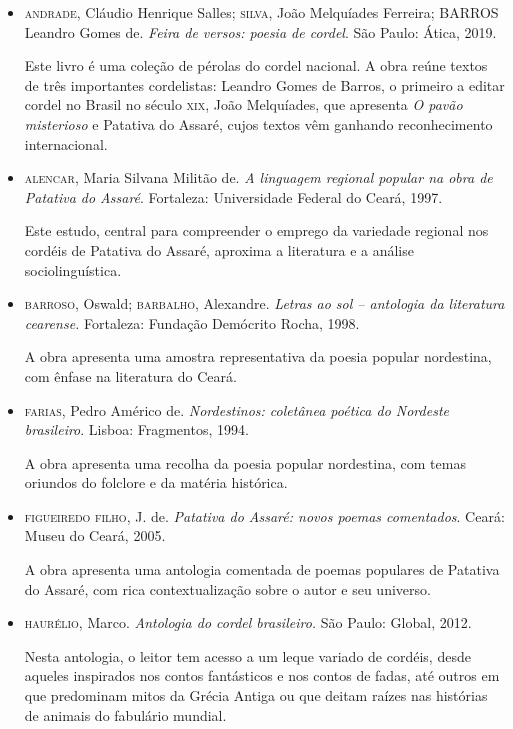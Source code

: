 \documentclass[12pt]{extarticle}
\begin{document}
\begin{itemize}

\item \textsc{andrade}, Cláudio Henrique Salles; \textsc{silva}, João
  Melquíades Ferreira; BARROS Leandro Gomes de. \textit{Feira de versos: poesia
  de cordel}.  São Paulo: Ática, 2019.

Este livro é uma coleção de pérolas do cordel nacional. A obra reúne textos de
três importantes cordelistas: Leandro Gomes de Barros, o primeiro a editar
cordel no Brasil no século \textsc{xix}, João Melquíades, que apresenta \emph{O pavão
misterioso} e Patativa do Assaré, cujos textos vêm ganhando reconhecimento
internacional.

\item \textsc{alencar}, Maria Silvana Militão de. \textit{A linguagem regional
  popular na obra de Patativa do Assaré}. Fortaleza: Universidade Federal do
  Ceará, 1997.

Este estudo, central para compreender o emprego da variedade regional nos
cordéis de Patativa do Assaré, aproxima a literatura e a análise
sociolinguística.

\item \textsc{barroso}, Oswald; \textsc{barbalho}, Alexandre. \textit{Letras ao
  sol -- antologia da literatura cearense.} Fortaleza: Fundação Demócrito
  Rocha, 1998.

A obra apresenta uma amostra representativa da poesia popular nordestina, com
ênfase na literatura do Ceará.

\item \textsc{farias}, Pedro Américo de. \textit{Nordestinos: coletânea poética
  do Nordeste brasileiro}. Lisboa: Fragmentos, 1994.

A obra apresenta uma recolha da poesia popular nordestina, com temas oriundos
do folclore e da matéria histórica.

\item \textsc{figueiredo filho}, J. de. \textit{Patativa do Assaré: novos
  poemas comentados}. Ceará: Museu do Ceará, 2005.

A obra apresenta uma antologia comentada de poemas populares de Patativa do
Assaré, com rica contextualização sobre o autor e seu universo.

\item \textsc{haurélio}, Marco. \textit{Antologia do cordel brasileiro.} São
  Paulo: Global, 2012.

Nesta antologia, o leitor tem acesso a um leque variado de cordéis, desde
aqueles inspirados nos contos fantásticos e nos contos de fadas, até outros em
que predominam mitos da Grécia Antiga ou que deitam raízes nas histórias de
animais do fabulário mundial.


\end{itemize}
\end{document}
